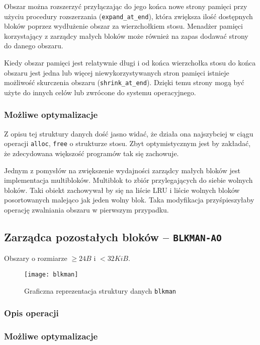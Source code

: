 \documentclass[12pt,a4paper,titlepage,twoside]{mwart}
\begin{document}
Obszar można rozszerzyć przyłączając do jego końca nowe strony pamięci przy
użyciu procedury rozszerzania (\verb+expand_at_end+), która zwiększa ilość
dostępnych bloków poprzez wydłużenie obszar za wierzchołkiem stosu. Menadżer
pamięci korzystający z zarządcy małych bloków może również na zapas dodawać
strony do danego obszaru.

Kiedy obszar pamięci jest relatywnie długi i od końca wierzchołka stosu do
końca obszaru jest jedna lub więcej niewykorzystywanych stron pamięci istnieje
możliwość skurczenia obszaru (\verb+shrink_at_end+). Dzięki temu strony mogą
być użyte do innych celów lub zwrócone do systemu operacyjnego.

\subsubsection{Możliwe optymalizacje}

Z opisu tej struktury danych dość jasno widać, że działa ona najszybciej w
ciągu operacji \verb+alloc+, \verb+free+ o strukturze stosu. Zbyt
optymistycznym jest by zakładać, że zdecydowana większość programów tak się
zachowuje.

Jednym z pomysłów na zwiększenie wydajności zarządcy małych bloków jest
implementacja multibloków. Multiblok to zbiór przylegających do siebie wolnych
bloków. Taki obiekt zachowywał by się na liście LRU i liście wolnych bloków
posortowanych malejąco jak jeden wolny blok. Taka modyfikacja przyśpieszyłaby
operację zwalniania obszaru w pierwszym przypadku.

\newpage

\subsection{Zarządca pozostałych bloków -- \texttt{BLKMAN-AO}}

Obszary o rozmiarze $\ge 24B$ i $< 32KiB$.

\begin{figure}[h]
\centering
\texttt{[image: blkman]}
\caption{Graficzna reprezentacja struktury danych \texttt{blkman}}
\end{figure}

\subsubsection{Opis operacji}

\subsubsection{Możliwe optymalizacje}
\end{document}

